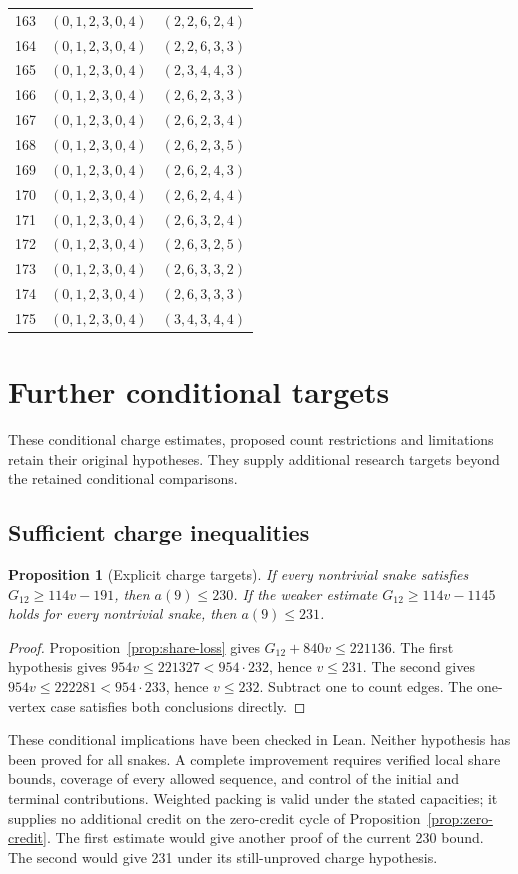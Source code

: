 \documentclass[11pt,a4paper]{article}
\newtheorem{proposition}[theorem]{Proposition}
\theoremstyle{definition}
\theoremstyle{remark}
\begin{document}
\begin{longtable}{rll}
163 & $(0,1,2,3,0,4)$ & $(2,2,6,2,4)$\\
164 & $(0,1,2,3,0,4)$ & $(2,2,6,3,3)$\\
165 & $(0,1,2,3,0,4)$ & $(2,3,4,4,3)$\\
166 & $(0,1,2,3,0,4)$ & $(2,6,2,3,3)$\\
167 & $(0,1,2,3,0,4)$ & $(2,6,2,3,4)$\\
168 & $(0,1,2,3,0,4)$ & $(2,6,2,3,5)$\\
169 & $(0,1,2,3,0,4)$ & $(2,6,2,4,3)$\\
170 & $(0,1,2,3,0,4)$ & $(2,6,2,4,4)$\\
171 & $(0,1,2,3,0,4)$ & $(2,6,3,2,4)$\\
172 & $(0,1,2,3,0,4)$ & $(2,6,3,2,5)$\\
173 & $(0,1,2,3,0,4)$ & $(2,6,3,3,2)$\\
174 & $(0,1,2,3,0,4)$ & $(2,6,3,3,3)$\\
175 & $(0,1,2,3,0,4)$ & $(3,4,3,4,4)$\\
\end{longtable}

\section{Further conditional targets}\label{app:research-targets}
These conditional charge estimates, proposed count restrictions and
limitations retain their original hypotheses. They supply additional
research targets beyond the retained conditional comparisons.

\subsection{Sufficient charge inequalities}
\begin{proposition}[Explicit charge targets]\label{prop:charge-targets}
If every nontrivial snake satisfies $G_{12}\ge114v-191$, then $a(9)\le230$. If the weaker estimate $G_{12}\ge114v-1145$ holds for every nontrivial snake, then $a(9)\le231$.
\end{proposition}
\begin{proof}
Proposition~\ref{prop:share-loss} gives $G_{12}+840v\le221136$. The first hypothesis gives $954v\le221327<954\cdot232$, hence $v\le231$. The second gives $954v\le222281<954\cdot233$, hence $v\le232$. Subtract one to count edges. The one-vertex case satisfies both conclusions directly.
\end{proof}
These conditional implications have been checked in Lean. Neither hypothesis has been proved for all snakes. A complete improvement requires verified local share bounds, coverage of every allowed sequence, and control of the initial and terminal contributions. Weighted packing is valid under the stated capacities; it supplies no additional credit on the zero-credit cycle of Proposition~\ref{prop:zero-credit}. The first estimate would give another proof of the current 230 bound. The second would give 231 under its still-unproved charge hypothesis.
\end{document}
